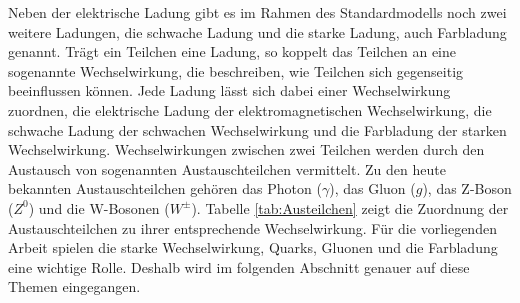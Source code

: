 \newline
Neben der elektrische Ladung gibt es im Rahmen des Standardmodells noch zwei weitere Ladungen, die schwache Ladung und die starke Ladung, auch Farbladung genannt.
Trägt ein Teilchen eine Ladung, so koppelt das Teilchen an eine sogenannte Wechselwirkung, die beschreiben, wie Teilchen sich gegenseitig beeinflussen können.
Jede Ladung lässt sich dabei einer Wechselwirkung zuordnen,
die elektrische Ladung der elektromagnetischen Wechselwirkung, die schwache Ladung der schwachen Wechselwirkung und die Farbladung der starken Wechselwirkung.
\newline
Wechselwirkungen zwischen zwei Teilchen werden durch den Austausch von sogenannten Austauschteilchen vermittelt.
Zu den heute bekannten Austauschteilchen gehören das Photon ($\gamma$), das Gluon ($g$), das Z-Boson ($Z^{0}$) und die W-Bosonen ($W^{\pm}$).
Tabelle \ref{tab:Austeilchen} zeigt die Zuordnung der Austauschteilchen zu ihrer entsprechende Wechselwirkung.
\newline
F{\"u}r die vorliegenden Arbeit spielen die starke Wechselwirkung, Quarks, Gluonen und die Farbladung eine wichtige Rolle.
Deshalb wird im folgenden Abschnitt genauer auf diese Themen eingegangen.